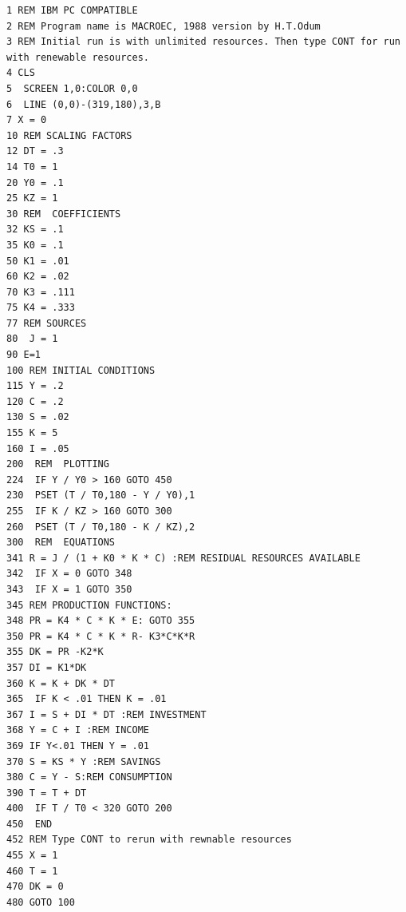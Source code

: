 \documentclass[3p,times,authoryear,twocolumn]{elsarticle}
\begin{document}
\begin{lstlisting}[basicstyle=\ttfamily\scriptsize,keepspaces=true,caption={MACROEC, transcribed from Figure~\ref{fig:macroec:basic} {\citep[Table~2]{odum1989}}. The scan's typeface does not distinguish the letter O from the digit zero; \texttt{T0}, \texttt{Y0} and \texttt{K0} are read as zeros, since \texttt{TO} is a reserved word and each name is assigned before it is used. The misspelling in line 452 is Odum's.},label={lst:macroec}]
1 REM IBM PC COMPATIBLE
2 REM Program name is MACROEC, 1988 version by H.T.Odum
3 REM Initial run is with unlimited resources. Then type CONT for run with renewable resources.
4 CLS
5  SCREEN 1,0:COLOR 0,0
6  LINE (0,0)-(319,180),3,B
7 X = 0
10 REM SCALING FACTORS
12 DT = .3
14 T0 = 1
20 Y0 = .1
25 KZ = 1
30 REM  COEFFICIENTS
32 KS = .1
35 K0 = .1
50 K1 = .01
60 K2 = .02
70 K3 = .111
75 K4 = .333
77 REM SOURCES
80  J = 1
90 E=1
100 REM INITIAL CONDITIONS
115 Y = .2
120 C = .2
130 S = .02
155 K = 5
160 I = .05
200  REM  PLOTTING
224  IF Y / Y0 > 160 GOTO 450
230  PSET (T / T0,180 - Y / Y0),1
255  IF K / KZ > 160 GOTO 300
260  PSET (T / T0,180 - K / KZ),2
300  REM  EQUATIONS
341 R = J / (1 + K0 * K * C) :REM RESIDUAL RESOURCES AVAILABLE
342  IF X = 0 GOTO 348
343  IF X = 1 GOTO 350
345 REM PRODUCTION FUNCTIONS:
348 PR = K4 * C * K * E: GOTO 355
350 PR = K4 * C * K * R- K3*C*K*R
355 DK = PR -K2*K
357 DI = K1*DK
360 K = K + DK * DT
365  IF K < .01 THEN K = .01
367 I = S + DI * DT :REM INVESTMENT
368 Y = C + I :REM INCOME
369 IF Y<.01 THEN Y = .01
370 S = KS * Y :REM SAVINGS
380 C = Y - S:REM CONSUMPTION
390 T = T + DT
400  IF T / T0 < 320 GOTO 200
450  END
452 REM Type CONT to rerun with rewnable resources
455 X = 1
460 T = 1
470 DK = 0
480 GOTO 100
\end{lstlisting}
\end{document}
